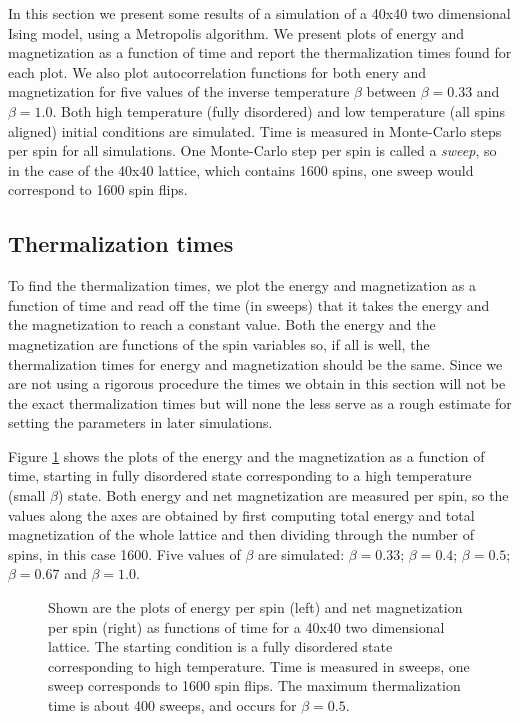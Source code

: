 \documentclass[11pt,a4paper]{article}
\begin{document}
In this section we present some results of a simulation of a 40x40 two dimensional Ising model, using a Metropolis algorithm.
 We present plots of energy and magnetization as a function of time and report the thermalization times found for each plot.
 We also plot autocorrelation functions for both enery and magnetization
 for five values of the inverse temperature $\beta$ between $\beta = 0.33$ and $\beta = 1.0$. 
 Both high temperature (fully disordered) and low temperature (all spins aligned) initial conditions are simulated.
 Time is measured in Monte-Carlo steps per spin for all simulations. One Monte-Carlo step per spin is called a \textit{sweep}, so
 in the case of the 40x40 lattice, which contains 1600 spins, one sweep would correspond to 1600 spin flips. 




\subsection{Thermalization times}
To find the thermalization times, we plot the energy and magnetization as a function of time and read off the time (in sweeps) that
 it takes the energy and the magnetization to reach a constant value. Both the energy and the magnetization are functions of the spin
 variables so, if all is well, the thermalization times for energy and magnetization should be the same. 
 Since we are not using a rigorous procedure the times we obtain in this section will not be the exact thermalization times but will none 
 the less serve as a rough estimate for setting the parameters in later simulations. 

Figure \ref{fig:enmvt_false} shows the plots of the energy and the magnetization as a function of time, starting in fully disordered state 
 corresponding to a high temperature (small $\beta$) state. Both energy and net magnetization are measured per spin, so the values along
 the axes are obtained by first computing total energy and total magnetization of the whole lattice and then dividing through the number
 of spins, in this case 1600. Five values of $\beta$ are simulated: $\beta = 0.33$; $\beta = 0.4$;
 $\beta = 0.5$; $\beta = 0.67$ and $\beta = 1.0$. 


\begin{figure}[H]
  \caption{Shown are the plots of energy per spin (left) and net magnetization per spin (right) as functions of time
    for a 40x40 two dimensional lattice. The starting condition is a fully
    disordered state corresponding to high temperature. Time is measured in sweeps, one sweep corresponds to 1600 spin
    flips. The maximum thermalization time is about 400 sweeps, and occurs for $\beta = 0.5$.}

\label{fig:enmvt_false}
\end{figure}
\end{document}
